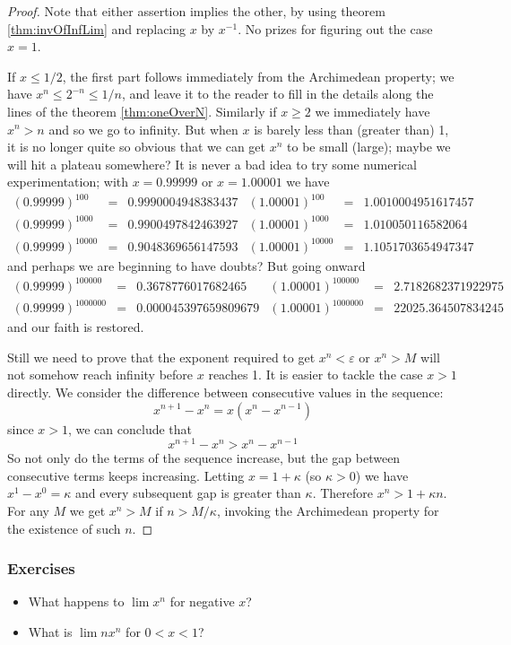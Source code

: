\begin{proof}
Note that either assertion implies the other, by using theorem \ref{thm:invOfInfLim} and replacing $x$ by $x^{-1}$. No prizes for figuring out the case $x=1$.

If $x \leq 1/2$, the first part follows immediately from the Archimedean property; we have $x^n \leq 2^{-n} \leq 1/n$, and leave it to the reader to fill in the details along the lines of the theorem \ref{thm:oneOverN}. Similarly if $x \geq 2$ we immediately have $x^n > n$ and so we go to infinity.
But when $x$ is barely less than (greater than) 1, it is no longer quite so obvious that we can get $x^n$ to be small (large); maybe we will hit a plateau somewhere?
It is never a bad idea to try some numerical experimentation; with $x=0.99999$ or  $x=1.00001$ we have
\begin{equation*}\begin{array}{cccccc}
(0.99999)^{100} &=& 0.9990004948383437 &(1.00001)^{100} &=& 1.0010004951617457\\
(0.99999)^{1000} &=& 0.9900497842463927 &(1.00001)^{1000} &=& 1.010050116582064\\
(0.99999)^{10000} &=& 0.9048369656147593 &(1.00001)^{10000} &=& 1.1051703654947347
\end{array}\end{equation*}
and perhaps we are beginning to have doubts? But going onward
\begin{equation*}\begin{array}{cccccc}
(0.99999)^{100000} &=& 0.3678776017682465 & (1.00001)^{100000} &=& 2.7182682371922975\\
(0.99999)^{1000000} &=& 0.000045397659809679 & (1.00001)^{1000000} &=& 22025.364507834245
\end{array}\end{equation*}
and our faith is restored.

Still we need to prove that the exponent required to get $x^n<\varepsilon$ or $x^n>M$ will not somehow reach infinity before $x$ reaches 1. It is easier to tackle the case $x>1$ directly.
We consider the difference between consecutive values in the sequence:
\[
x^{n+1}-x^n = x(x^n-x^{n-1})
\]
since $x>1$, we can conclude that
\[
x^{n+1}-x^n > x^n-x^{n-1}
\]
So not only do the terms of the sequence increase, but the gap between consecutive terms keeps increasing. Letting $x=1+\kappa$ (so $\kappa>0$) we have $x^1-x^0=\kappa$ and every subsequent gap is greater than $\kappa$. Therefore $x^n > 1 + \kappa n$. For any $M$ we get $x^n>M$ if $n>M/\kappa$, invoking the Archimedean property for the existence of such $n$.
\end{proof}

\subsubsection{Exercises}
\begin{itemize}
\item What happens to $\lim x^n$ for negative $x$?
\item What is $\lim nx^n$ for $0 < x < 1$?
\end{itemize}

